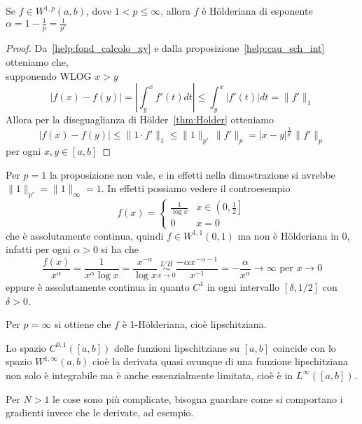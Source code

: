\begin{proposition}
    Se \(f \in W^{1, p}{(a, b)}\), dove \(1 < p \le \infty\), allora \(f\) è
    Hölderiana di esponente \(\alpha = 1 - \frac{1}{p} = \frac{1}{p'}\)
\end{proposition}
\begin{proof}
    Da~\eqref{help:fond_calcolo_xy} e dalla proposizione~\ref{help:cau_sch_int}
    otteniamo che, \\ supponendo WLOG \(x > y\)
    \[
      |f{(x)} - f{(y)}| = \left| \int_{y}^{x} f'{(t)}dt \right| \le \int_y^{x}
      |f'{(t)}|dt = \|f'\|_1
    \]
    Allora per la diseguaglianza di Hölder~\ref{thm:Holder} otteniamo
    \[
      \left| f{(x)} - f{(y)} \right| \le \|1 \cdot  f'\|_1 \le 
      \|1\|_{p'}\,  \|f'\|_p= |x-y|^{\frac{1}{p'}} \|f'\|_p 
    \]
    per ogni \(x, y \in [a,b]\) 
\end{proof}
\begin{remark}
    Per \( p = 1\) la proposizione non vale, e in effetti nella dimostrazione si
    avrebbe \(\|1\|_{p'} = \|1\|_{\infty}= 1\). In effetti possiamo vedere il
    controesempio 
    \[
      f{(x)} = \begin{cases}
          \frac{1}{\log x} & x \in \left(0, \frac{1}{2}\right] \\
          0 & x = 0
      \end{cases}
    \]
    che è assolutamente continua, quindi \(f \in W^{1,1}{(0,1)}\) ma non è
    Hölderiana in 0, infatti per ogni \(\alpha > 0\) si ha che
    \[
        \frac{f{(x)}}{x^{\alpha}} = \frac{1}{x^{\alpha} \log x} =
        \frac{x^{-\alpha}}{\log x} \underset{x \to 0}{\overset{L'H}{\sim}} \frac{-\alpha x^{-\alpha -
        1}}{x^{-1}}= -\frac{\alpha}{x^{\alpha}}\to \infty \text{ per } x \to 0
    \]
    eppure è assolutamente continua in quanto \(C^{1}\) in ogni intervallo
    \([\delta, 1 /2]\) con \(\delta > 0\).
\end{remark}
\begin{note}
    Per \(p = \infty\) si ottiene che \(f\) è 1-Hölderiana, cioè lipschitziana.
\end{note}

Lo spazio \(C^{0, 1}{([a,b])}\) delle funzioni lipschitziane su \([a,b]\)
coincide con lo spazio \(W^{1, \infty}{(a,b)}\) cioè la derivata quasi ovunque
di una funzione lipschitziana non solo è integrabile ma è anche essenzialmente
limitata, cioè è in \(L^{\infty}{([a, b])}\).

Per \(N > 1\) le cose sono più complicate, bisogna guardare come si comportano i
gradienti invece che le derivate, ad esempio.

